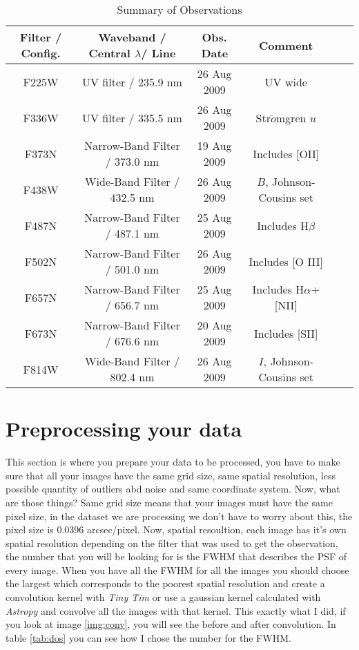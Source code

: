 \documentclass[11pt,fleqn]{book} %
\begin{document}
\begin{table}[h]
  \centering
  \begin{tabular}{ c c c c c c }
    \hline\hline
    Filter / Config. & Waveband / Central $\lambda$/ Line & Obs. Date & Comment \\
    \hline
    F225W & UV filter / 235.9 nm & 26 Aug 2009 &  UV wide\\
    
    F336W & UV filter / 335.5 nm & 26 Aug 2009 & Str$\ddot{o}$mgren $u$\\
    
    F373N & Narrow-Band Filter / 373.0 nm & 19 Aug 2009 & Includes \textsc{[OII]}\\
    
    F438W & Wide-Band Filter / 432.5 nm & 26 Aug 2009 & $B$, Johnson-Cousins set\\
    
    F487N & Narrow-Band Filter / 487.1 nm & 25 Aug 2009 & Includes H$\beta$\\
    
    F502N & Narrow-Band Filter / 501.0 nm & 26 Aug 2009 & Includes \textsc{[O III]}\\
    
    F657N & Narrow-Band Filter / 656.7 nm & 25 Aug 2009 & Includes H$\alpha$+\textsc{[NII]}\\
    
    F673N & Narrow-Band Filter / 676.6 nm & 20 Aug 2009 & Includes \textsc{[SII]}\\
    
    F814W & Wide-Band Filter / 802.4 nm & 26 Aug 2009 & $I$, Johnson-Cousins set\\
    \hline
  \end{tabular}
  \caption{Summary of Observations}
  \label{tab:uno}
\end{table}

\section{Preprocessing your data}
This section is where you prepare your data to be processed, you have to make sure that all your images have the same grid size, same spatial resolution, less possible quantity of outliers abd noise and same coordinate system. Now, what are those things? Same grid size means that your images must have the same pixel size, in the dataset we are processing we don't have to worry about this, the pixel size is 0.0396 arcsec/pixel. Now, spatial resoultion, each image has it's own spatial resolution depending on the filter that was used to get the observation, the number that you will be looking for is the FWHM that describes the PSF of every image. When you have all the FWHM for all the images you should choose the largest which corresponds to the poorest spatial resolution and create a convolution kernel with \emph{Tiny Tim} or use a gaussian kernel calculated with \emph{Astropy} and convolve all the images with that kernel. This exactly what I did, if you look at image \ref{img:conv}, you will see the before and after convolution. In table \ref{tab:dos} you can see how I chose the number for the FWHM.
\end{document}
